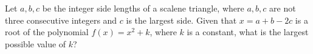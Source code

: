 Let $a,b,c$ be the integer side lengths of a scalene triangle, where $a,b,c$ are not three consecutive integers and $c$ is the largest side. Given that $x=a+b-2c$ is a root of the polynomial $f(x)=x^2+k$, where $k$ is a constant, what is the largest possible value of $k$?
